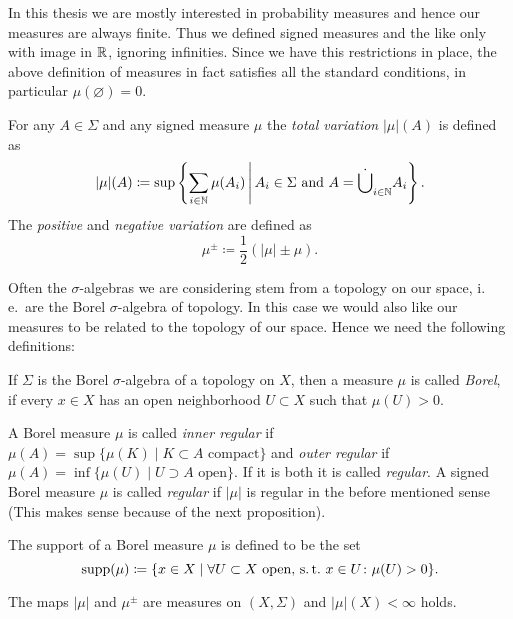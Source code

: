 \begin{rem}
  In this thesis we are mostly interested in probability measures and hence our measures are always finite. Thus we defined signed measures and the like only with image in \(\mathbb{R}\), ignoring infinities. Since we have this restrictions in place, the above definition of measures in fact satisfies all the standard conditions, in particular \(\mu(\varnothing) = 0\).
\end{rem}

\begin{defin}
    For any \(A \in \Sigma\) and any signed measure \(\mu\) the \emph{total variation} \(|\mu|(A)\) is defined as
  \[
    |\mu|(A) \coloneqq \sup \left\{\sum_{i \in \mathbb{N}} \mu(A_i) \,\middle|\, A_i \in \Sigma \text{ and } A = \dot \bigcup_{i \in \mathbb{N}} A_i \right \}.
  \]
  The \emph{positive} and \emph{negative variation} are defined as
  \[
    \mu^\pm \coloneqq \frac12 (|\mu| \pm \mu).
  \]
\end{defin}

Often the \(\sigma\)-algebras we are considering stem from a topology on our space, i.\,e.\ are the Borel \(\sigma\)-algebra of topology. In this case we would also like our measures to be related to the topology of our space. Hence we need the following definitions:

\begin{defin}
  If \(\Sigma\) is the Borel \(\sigma\)-algebra of a topology on \(X\), then a measure \(\mu\) is called \emph{Borel}, if every \(x \in X\) has an open neighborhood \(U \subset X\) such that \(\mu(U) > 0\).
  
  A Borel measure \(\mu\) is called \emph{inner regular} if \(\mu(A) = \sup \{ \mu(K) \mid K \subset A \text{ compact}\}\) and \emph{outer regular} if \(\mu(A) = \inf \{ \mu(U) \mid U \supset A \text{ open}\}\). If it is both it is called \emph{regular}. A signed Borel measure \(\mu\) is called \emph{regular} if \(|\mu|\) is regular in the before mentioned sense (This makes sense because of the next proposition).

  The support of a Borel measure \(\mu\) is defined to be the set
  \[
    \operatorname{supp}(\mu) \coloneqq \{x \in X \mid \forall U \subset X \text{ open, s.\,t.\ } x \in U\colon \mu(U) > 0\}.
  \]
\end{defin}

\begin{prop}
  The maps \(|\mu|\) and \(\mu^\pm\) are measures on \((X, \Sigma)\) and \(|\mu|(X) < \infty\) holds.
\end{prop}

